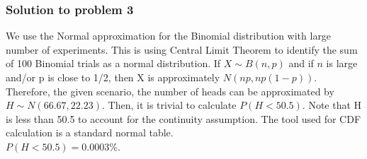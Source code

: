 \documentclass[12pt]{article}%
\begin{document}
\subsubsection{Solution to problem 3}

We use the Normal approximation for the Binomial distribution with large number of experiments. This is using Central Limit Theorem to identify the sum of 100 Binomial trials as a normal distribution. If $X \sim B(n, p)$ and if $n$ is large and/or p is close to 1/2, then X is approximately $N(np, np(1-p))$. Therefore, the given scenario, the number of heads can be approximated by $H \sim N(66.67, 22.23)$. Then, it is trivial to calculate $P(H<50.5)$. Note that H is less than 50.5 to account for the continuity assumption. The tool used for CDF calculation is a standard normal table.\\

\noindent $P(H<50.5) = 0.0003\%$.

\end{document}
